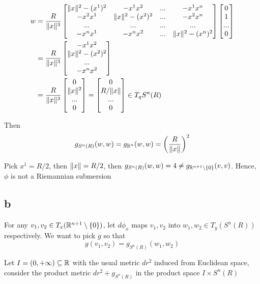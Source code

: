 \begin{align*}
	w 
	&= \frac{R}{\norm{x}^3} \begin{bmatrix}
		\norm{x}^2 - (x^1)^2 & -x^1 x^2 & ... & -x^1 x^n \\
		-x^2 x^1 & \norm{x}^2 - (x^2)^2 & ... & -x^2 x^n \\
		... & ... & ... & ... \\
		-x^n x^1 & -x^n x^2 & ... & \norm{x}^2 - (x^n)^2
	\end{bmatrix} \begin{bmatrix}
		0 \\ 1 \\ ... \\ 0
	\end{bmatrix} \\
	&=  \frac{R}{\norm{x}^3} \begin{bmatrix}
		- x^1 x^2 \\ \norm{x}^2 - (x^2)^2 \\ ... \\ - x^n x^2
	\end{bmatrix} \\
	&= \frac{R}{\norm{x}^3} \begin{bmatrix}
		0 \\ \norm{x}^2 \\ ... \\ 0
	\end{bmatrix} = \begin{bmatrix}
	0 \\ R / \norm{x} \\ ... \\ 0
	\end{bmatrix} \in T_q S^n(R)
\end{align*}

Then
$$
	g_{S^n(R)}(w, w) = g_{\R^n}(w, w) = \tuple*{\frac{R}{\norm{x}}}^2
$$

Pick $x^1 = R / 2$, then $\norm{x} = R / 2$, then $g_{S^n(R)}(w, w) = 4 \neq g_{\R^{n+1} \setminus \set{0}} (v, v)$. Hence, $\phi$ is not a Riemannian submersion

\subsection{b} 

For any $v_1, v_2 \in T_x(\R^{n+1} \setminus \set{0})$, let $d\phi_x$ maps $v_1, v_2$ into $w_1, w_2 \in T_y(S^n(R))$ respectively. We want to pick $g$ so that
$$
	g(v_1, v_2) = g_{S^n(R)}(w_1, w_2)
$$

Let $I = (0, +\infty) \subseteq \R$ with the usual metric $dr^2$ induced from Euclidean space, consider the product metric $dr^2 + g_{S^n(R)}$ in the product space $I \times S^n(R)$
\begin{center}
\end{center}

